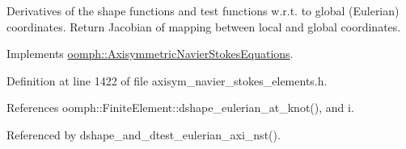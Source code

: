 Derivatives of the shape functions and test functions w.\+r.\+t. to global (Eulerian) coordinates. Return Jacobian of mapping between local and global coordinates. 

Implements \hyperlink{classoomph_1_1AxisymmetricNavierStokesEquations_a76e090fdac4507d10eb9f81feb53a51b}{oomph\+::\+Axisymmetric\+Navier\+Stokes\+Equations}.



Definition at line 1422 of file axisym\+\_\+navier\+\_\+stokes\+\_\+elements.\+h.



References oomph\+::\+Finite\+Element\+::dshape\+\_\+eulerian\+\_\+at\+\_\+knot(), and i.



Referenced by dshape\+\_\+and\+\_\+dtest\+\_\+eulerian\+\_\+axi\+\_\+nst().

\mbox{\label{classoomph_1_1AxisymmetricQCrouzeixRaviartElement_abef9fe3b35d6a0eb08b18a33aa6b03c7}} 
